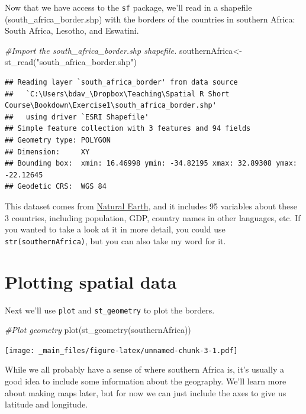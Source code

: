 \documentclass[
]{book}
\newenvironment{Shaded}{\begin{snugshade}}{\end{snugshade}}
\newcommand{\CommentTok}[1]{\textcolor[rgb]{0.56,0.35,0.01}{\textit{#1}}}
\newcommand{\FunctionTok}[1]{\textcolor[rgb]{0.00,0.00,0.00}{#1}}
\newcommand{\NormalTok}[1]{#1}
\newcommand{\OtherTok}[1]{\textcolor[rgb]{0.56,0.35,0.01}{#1}}
\newcommand{\StringTok}[1]{\textcolor[rgb]{0.31,0.60,0.02}{#1}}
\begin{document}
Now that we have access to the \texttt{sf} package, we'll read in a shapefile (south\_africa\_border.shp) with the borders of the countries in southern Africa: South Africa, Lesotho, and Eswatini.

\begin{Shaded}
\begin{Highlighting}[]
\CommentTok{\#Import the south\_africa\_border.shp shapefile. }
\NormalTok{southernAfrica}\OtherTok{\textless{}{-}}\FunctionTok{st\_read}\NormalTok{(}\StringTok{"south\_africa\_border.shp"}\NormalTok{)}
\end{Highlighting}
\end{Shaded}

\begin{verbatim}
## Reading layer `south_africa_border' from data source 
##   `C:\Users\bdav_\Dropbox\Teaching\Spatial R Short Course\Bookdown\Exercise1\south_africa_border.shp' 
##   using driver `ESRI Shapefile'
## Simple feature collection with 3 features and 94 fields
## Geometry type: POLYGON
## Dimension:     XY
## Bounding box:  xmin: 16.46998 ymin: -34.82195 xmax: 32.89308 ymax: -22.12645
## Geodetic CRS:  WGS 84
\end{verbatim}

This dataset comes from \href{www.naturalearthdata.com}{Natural Earth}, and it includes 95 variables about these 3 countries, including population, GDP, country names in other languages, etc. If you wanted to take a look at it in more detail, you could use \texttt{str(southernAfrica)}, but you can also take my word for it.

\hypertarget{plotting-spatial-data}{%
\section{Plotting spatial data}\label{plotting-spatial-data}}

Next we'll use \texttt{plot} and \texttt{st\_geometry} to plot the borders.

\begin{Shaded}
\begin{Highlighting}[]
\CommentTok{\#Plot geometry}
\FunctionTok{plot}\NormalTok{(}\FunctionTok{st\_geometry}\NormalTok{(southernAfrica))}
\end{Highlighting}
\end{Shaded}

\texttt{[image: \_main\_files/figure-latex/unnamed-chunk-3-1.pdf]}

While we all probably have a sense of where southern Africa is, it's usually a good idea to include some information about the geography. We'll learn more about making maps later, but for now we can just include the axes to give us latitude and longitude.
\end{document}

